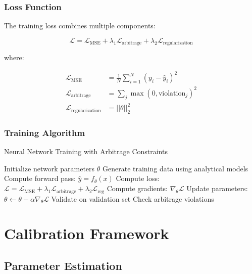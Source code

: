 \documentclass[12pt,a4paper]{article}
\begin{document}
\subsubsection{Loss Function}

The training loss combines multiple components:

\begin{equation}
\mathcal{L} = \mathcal{L}_{\text{MSE}} + \lambda_1 \mathcal{L}_{\text{arbitrage}} + \lambda_2 \mathcal{L}_{\text{regularization}}
\end{equation}

where:

\begin{align}
\mathcal{L}_{\text{MSE}} &= \frac{1}{N} \sum_{i=1}^{N} (y_i - \hat{y}_i)^2 \\
\mathcal{L}_{\text{arbitrage}} &= \sum_{j} \max(0, \text{violation}_j)^2 \\
\mathcal{L}_{\text{regularization}} &= ||\theta||_2^2
\end{align}

\subsubsection{Training Algorithm}

\begin{algorithm}
\caption{Neural Network Training with Arbitrage Constraints}
\begin{algorithmic}[1]
\STATE Initialize network parameters $\theta$
\STATE Generate training data using analytical models
        \STATE Compute forward pass: $\hat{y} = f_\theta(x)$
        \STATE Compute loss: $\mathcal{L} = \mathcal{L}_{\text{MSE}} + \lambda_1 \mathcal{L}_{\text{arbitrage}} + \lambda_2 \mathcal{L}_{\text{reg}}$
        \STATE Compute gradients: $\nabla_\theta \mathcal{L}$
        \STATE Update parameters: $\theta \leftarrow \theta - \alpha \nabla_\theta \mathcal{L}$
    \ENDFOR
    \STATE Validate on validation set
    \STATE Check arbitrage violations
\ENDFOR
\end{algorithmic}
\end{algorithm}

\section{Calibration Framework}

\subsection{Parameter Estimation}
\end{document}

